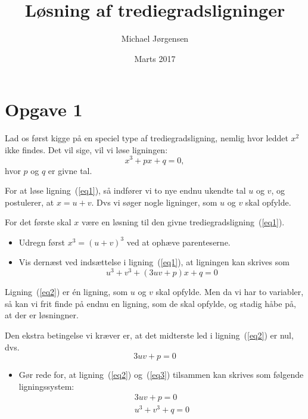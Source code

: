 \documentclass[12pt,oneside,a4paper]{article}
\title{Løsning af trediegradsligninger}
\date{Marts 2017}
\author{Michael Jørgensen}
\begin{document}
\maketitle
\section*{Opgave 1}
Lad os først kigge på en speciel type af trediegradsligning, nemlig
hvor leddet $x^2$ ikke findes. Det vil sige, vil vi løse ligningen:
\begin{equation}
    x^3 + px +q = 0,
    \label{eq1}
\end{equation}
hvor $p$ og $q$ er givne tal. 

For at løse ligning~(\ref{eq1}), så indfører vi to nye endnu ukendte tal $u$ og
$v$, og postulerer, at $x=u+v$. Dvs vi søger nogle ligninger, som $u$ og $v$
skal opfylde.

For det første skal $x$ være en løsning til den givne
trediegradsligning~(\ref{eq1}).
\begin{itemize}
    \item Udregn først $x^3 = (u+v)^3$ ved at ophæve parenteserne.
    \item Vis dernæst ved indsættelse i ligning~(\ref{eq1}), at ligningen kan
        skrives som
        \begin{equation}
            u^3+v^3 + (3uv+p)x + q=0
            \label{eq2}
        \end{equation}
\end{itemize}

Ligning~(\ref{eq2}) er én ligning, som $u$ og $v$ skal opfylde. Men da vi har
to variabler, så kan vi frit finde på endnu en ligning, som de skal opfylde, og
stadig håbe på, at der er løsningner.

Den ekstra betingelse vi kræver er, at det midterste led i ligning~(\ref{eq2}) er nul, dvs.
\begin{equation}
    3uv+p = 0
    \label{eq3}
\end{equation}
\begin{itemize}
    \item Gør rede for, at ligning~(\ref{eq2}) og~(\ref{eq3}) tilsammen kan skrives som følgende ligningssystem:
        \begin{eqnarray}
            3uv+p = 0 \label{eq4}\\
            u^3+v^3+q = 0 \label{eq5}
        \end{eqnarray}
\end{itemize}
\end{document}
